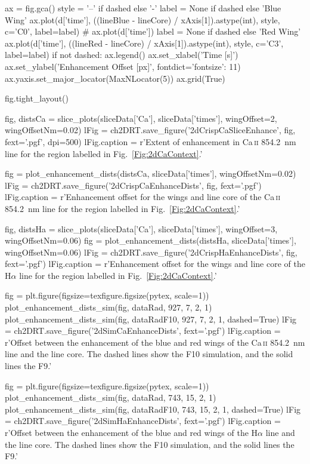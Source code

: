 \begin{pycode}[2DRT]
    ax = fig.gca()
    style = '--' if dashed else '-'
    label = None if dashed else 'Blue Wing'
    ax.plot(d['time'], ((lineBlue - lineCore) / xAxis[1]).astype(int), style, c='C0', label=label)
#     ax.plot(d['time'])
    label = None if dashed else 'Red Wing'
    ax.plot(d['time'], ((lineRed - lineCore) / xAxis[1]).astype(int), style, c='C3', label=label)
    if not dashed:
        ax.legend()
    ax.set_xlabel('Time [s]')
    ax.set_ylabel('Enhancement Offset [px]', fontdict={'fontsize': 11})
    ax.yaxis.set_major_locator(MaxNLocator(5))
    ax.grid(True)

    fig.tight_layout()

fig, distsCa = slice_plots(sliceData['Ca'], sliceData['times'], wingOffset=2, wingOffsetNm=0.02)
lFig = ch2DRT.save_figure('2dCrispCaSliceEnhance', fig, fext='.pgf', dpi=500)
lFig.caption = r'Extent of enhancement in Ca\,\textsc{ii} \SI{854.2}{\nano\metre} line for the region labelled in Fig.~\ref{Fig:2dCaContext}.'

fig = plot_enhancement_dists(distsCa, sliceData['times'], wingOffsetNm=0.02)
lFig = ch2DRT.save_figure('2dCrispCaEnhanceDists', fig, fext='.pgf')
lFig.caption = r'Enhancement offset for the wings and line core of the Ca\,\textsc{ii} \SI{854.2}{\nano\metre} line for the region labelled in Fig.~\ref{Fig:2dCaContext}.'

fig, distsHa = slice_plots(sliceData['Ca'], sliceData['times'], wingOffset=3, wingOffsetNm=0.06)
fig = plot_enhancement_dists(distsHa, sliceData['times'], wingOffsetNm=0.06)
lFig = ch2DRT.save_figure('2dCrispHaEnhanceDists', fig, fext='.pgf')
lFig.caption = r'Enhancement offset for the wings and line core of the H$\alpha$ line for the region labelled in Fig.~\ref{Fig:2dCaContext}.'

fig = plt.figure(figsize=texfigure.figsize(pytex, scale=1))
plot_enhancement_dists_sim(fig, dataRad, 927, 7, 2, 1)
plot_enhancement_dists_sim(fig, dataRadF10, 927, 7, 2, 1, dashed=True)
lFig = ch2DRT.save_figure('2dSimCaEnhanceDists', fext='.pgf')
lFig.caption = r'Offset between the enhancement of the blue and red wings of the Ca\,\textsc{ii} \SI{854.2}{\nano\metre} line and the line core. The dashed lines show the F10 simulation, and the solid lines the F9.'

fig = plt.figure(figsize=texfigure.figsize(pytex, scale=1))
plot_enhancement_dists_sim(fig, dataRad, 743, 15, 2, 1)
plot_enhancement_dists_sim(fig, dataRadF10, 743, 15, 2, 1, dashed=True)
lFig = ch2DRT.save_figure('2dSimHaEnhanceDists', fext='.pgf')
lFig.caption = r'Offset between the enhancement of the blue and red wings of the H$\alpha$ line and the line core. The dashed lines show the F10 simulation, and the solid lines the F9.'

\end{pycode}


